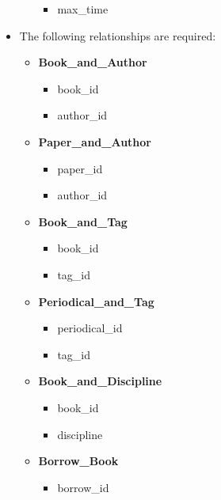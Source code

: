 \documentclass{article}
\begin{document}
\begin{itemize}
\begin{itemize}
\begin{itemize}
                    \item max\_time
                \end{itemize}
        \end{itemize}
    \item The following relationships are required:
        \begin{itemize}
            \item \textbf{Book\_and\_Author}
                \begin{itemize}
                    \item {\color{blue}book\_id}
                    \item {\color{blue}author\_id}
                \end{itemize}
            \item \textbf{Paper\_and\_Author}
                \begin{itemize}
                    \item {\color{blue}paper\_id}
                    \item {\color{blue}author\_id}
                \end{itemize}
            \item \textbf{Book\_and\_Tag}
                \begin{itemize}
                    \item {\color{blue}book\_id}
                    \item {\color{blue}tag\_id}
                \end{itemize}
            \item \textbf{Periodical\_and\_Tag}
                \begin{itemize}
                    \item {\color{blue}periodical\_id}
                    \item {\color{blue}tag\_id}
                \end{itemize}
            \item \textbf{{\color{green}Book\_and\_Discipline}}
                \begin{itemize}
                    \item {\color{blue}book\_id}
                    \item {\color{blue}discipline}
                \end{itemize}
            \item \textbf{{\color{green}Borrow\_Book}}
                \begin{itemize}
                    \item {\color{blue}borrow\_id}

\end{itemize}
\end{itemize}
\end{itemize}
\end{document}
